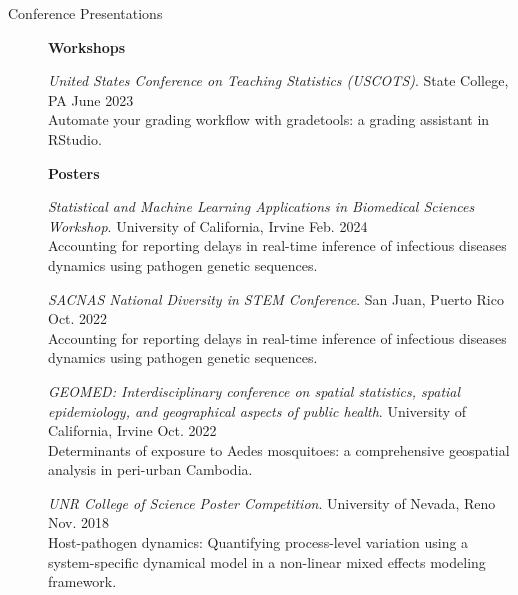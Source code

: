\documentclass{article}
\begin{document}
\begin{description}
	\vspace{-2mm}
	\item[Conference Presentations]\hspace*{.1in}
	 
	\textbf{Workshops}
	
	\setlength{\leftskip}{0.5cm}
	
		\vspace*{1mm}	
		
		\textit{United States Conference on Teaching Statistics (USCOTS)}. State College, PA \hfill{June 2023}\\ 
		Automate your grading workflow with gradetools: a grading assistant in RStudio.
		
		\setlength{\leftskip}{0cm}

	\textbf{Posters}
	
	\setlength{\leftskip}{0.5cm}
	
		\vspace*{1mm}	
		
		\textit{Statistical and Machine Learning Applications in Biomedical Sciences Workshop}. University of California, Irvine \hfill{Feb. 2024}\\
		Accounting for reporting delays in real-time inference of infectious diseases dynamics using pathogen genetic sequences.
		\vspace*{1mm}

		\textit{SACNAS National Diversity in STEM Conference}. San Juan, Puerto Rico \hfill{Oct. 2022}\\
		Accounting for reporting delays in real-time inference of infectious diseases dynamics using pathogen genetic sequences.
		\vspace*{1mm}
		
		\textit{GEOMED: Interdisciplinary conference on spatial statistics, spatial epidemiology, and geographical aspects of public health}. University of California, Irvine \hfill{Oct. 2022}\\
		Determinants of exposure to Aedes mosquitoes: a comprehensive geospatial analysis in peri-urban Cambodia.
		\vspace*{1mm}
		
		\textit{UNR College of Science Poster Competition}. University of Nevada, Reno \hfill{Nov. 2018}\\
		Host-pathogen dynamics: Quantifying process-level variation using a system-specific dynamical model in a non-linear mixed effects modeling framework.
		\vspace*{1mm}
		

\end{description}
\end{document}
